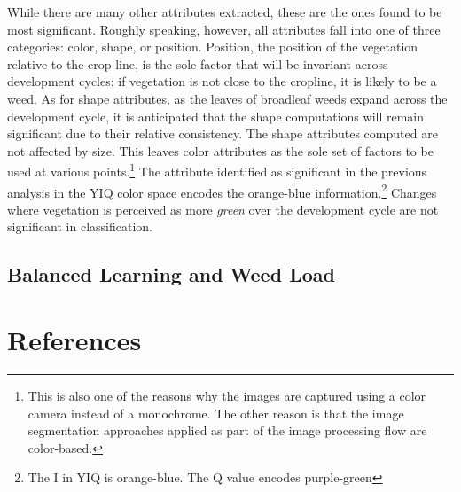 \documentclass[12pt]{article}
\begin{document}
While there are many other attributes extracted, these are the ones found to be most significant. Roughly speaking, however, all attributes fall into one of three categories: color, shape, or position. Position, the position of the vegetation relative to the crop line, is the sole factor that will be invariant across development cycles: if vegetation is not close to the cropline, it is likely to be a weed. As for shape attributes, as the leaves of broadleaf weeds expand across the development cycle, it is anticipated that the shape computations will remain significant due to their relative consistency. The shape attributes computed are not affected by size.
This leaves color attributes as the sole set of factors to be used at various points.\footnote{This is also one of the reasons why the images are captured using a color camera instead of a monochrome. The other reason is that the image segmentation approaches applied as part of the image processing flow are color-based.}
 The attribute identified as significant in the previous analysis in the YIQ color space encodes the orange-blue information.\footnote{The I in YIQ is orange-blue. The Q value encodes purple-green} Changes where vegetation is perceived as more \textit{green} over the development cycle are not significant in classification.

\subsection{Balanced Learning and Weed Load}


 \newpage






%



 


% 
%

\newpage
{
\section{References}
\printbibliography[heading=none]
}
\end{document}
